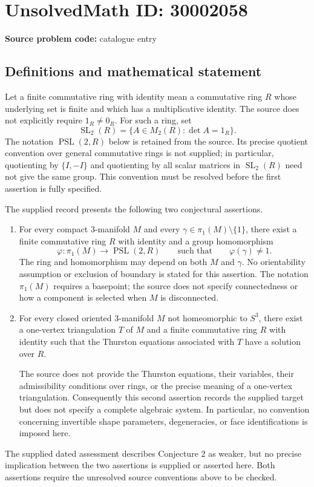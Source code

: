 \documentclass[11pt]{article}
\begin{document}
\section*{UnsolvedMath ID: 30002058}
\textbf{Source problem code:} catalogue entry
\subsection{Definitions and mathematical statement}
Let a finite commutative ring with identity mean a commutative ring \(R\) whose underlying set is finite and which has a multiplicative identity. The source does not explicitly require \(1_R\ne 0_R\). For such a ring, set
\[
\operatorname{SL}_2(R)=\{A\in M_2(R):\det A=1_R\}.
\]
The notation \(\operatorname{PSL}(2,R)\) below is retained from the source. Its precise quotient convention over general commutative rings is not supplied; in particular, quotienting by \(\{I,-I\}\) and quotienting by all scalar matrices in \(\operatorname{SL}_2(R)\) need not give the same group. This convention must be resolved before the first assertion is fully specified.

The supplied record presents the following two conjectural assertions.
\begin{enumerate}
\item For every compact \(3\)-manifold \(M\) and every \(\gamma\in\pi_1(M)\setminus\{1\}\), there exist a finite commutative ring \(R\) with identity and a group homomorphism
\[
\varphi:\pi_1(M)\longrightarrow\operatorname{PSL}(2,R)
\qquad\text{such that}\qquad
\varphi(\gamma)\ne 1.
\]
The ring and homomorphism may depend on both \(M\) and \(\gamma\). No orientability assumption or exclusion of boundary is stated for this assertion. The notation \(\pi_1(M)\) requires a basepoint; the source does not specify connectedness or how a component is selected when \(M\) is disconnected.
\item For every closed oriented \(3\)-manifold \(M\) not homeomorphic to \(S^3\), there exist a one-vertex triangulation \(T\) of \(M\) and a finite commutative ring \(R\) with identity such that the Thurston equations associated with \(T\) have a solution over \(R\).

The source does not provide the Thurston equations, their variables, their admissibility conditions over rings, or the precise meaning of a one-vertex triangulation. Consequently this second assertion records the supplied target but does not specify a complete algebraic system. In particular, no convention concerning invertible shape parameters, degeneracies, or face identifications is imposed here.
\end{enumerate}
The supplied dated assessment describes Conjecture 2 as weaker, but no precise implication between the two assertions is supplied or asserted here. Both assertions require the unresolved source conventions above to be checked.
\end{document}
